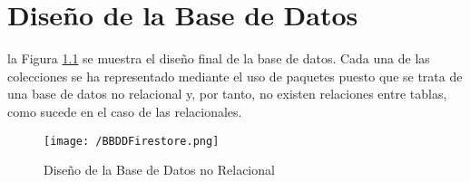 \chapter{Diseño de la Base de Datos}
\label{chap:bbdd}
 la Figura \ref{fig:bbddfirestore} se muestra el diseño final de la base de datos. Cada una de las colecciones se ha representado mediante el uso de paquetes puesto que se trata de una base de datos no relacional y, por tanto, no existen relaciones entre tablas, como sucede en el caso de las relacionales.

\begin{figure}[!h]
	\begin{center}
		\texttt{[image: /BBDDFirestore.png]}
		\caption{Diseño de la Base de Datos no Relacional}
		\label{fig:bbddfirestore}
	\end{center}
\end{figure}
